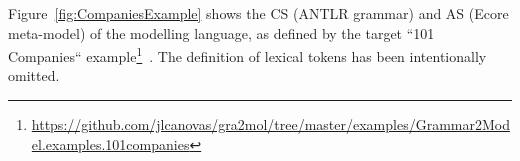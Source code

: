 \documentclass{llncs}
\begin{document}
Figure~\ref{fig:CompaniesExample} shows the CS (ANTLR grammar) and AS (Ecore meta-model) of the modelling language, as defined by the target ``101 Companies`` example\footnote{\url{https://github.com/jlcanovas/gra2mol/tree/master/examples/Grammar2Model.examples.101companies}}~\cite{favre2012101companies}. The definition of lexical tokens has been intentionally omitted.




%
%
%
\end{document}
